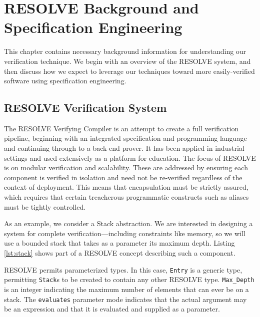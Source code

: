 \chapter{RESOLVE Background and Specification Engineering}\label{ch:resolveBackground}

This chapter contains necessary background information for understanding our verification technique.  We begin with an overview of the RESOLVE system, and then discuss how we expect to leverage our techniques toward more easily-verified software using specification engineering.


\section{RESOLVE Verification System}

The RESOLVE\cite{RESOLVE} Verifying Compiler is an attempt to create a full verification pipeline, beginning with an integrated specification and programming language and continuing through to a back-end prover.  It has been applied in industrial settings\cite{hollingsworth2000experience} and used extensively as a platform for education\cite{leonard2009injecting, sitaraman2009engaging, sitaraman2001formal}.  The focus of RESOLVE is on modular verification and scalability.  These are addressed by ensuring each component is verified in isolation and need not be re-verified regardless of the context of deployment.  This means that encapsulation must be strictly assured, which requires that certain treacherous programmatic constructs such as aliases must be tightly controlled.

As an example, we consider a Stack abstraction.  We are interested in designing a system for complete verification---including constraints like memory, so we will use a bounded stack that takes as a parameter its maximum depth.  Listing \ref{lst:stack} shows part of a RESOLVE concept describing such a component.



RESOLVE permits parameterized types.  In this case, \texttt{Entry} is a generic type, permitting \texttt{Stack}s to be created to contain any other RESOLVE type.  \texttt{Max\_Depth} is an integer indicating the maximum number of elements that can ever be on a stack.  The \texttt{evaluates} parameter mode indicates that the actual argument may be an expression and that it is evaluated and supplied as a parameter.

